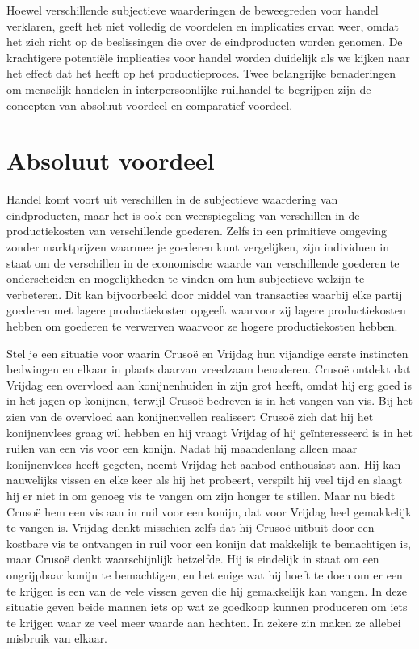Hoewel verschillende subjectieve waarderingen de beweegreden voor handel verklaren, geeft het niet volledig de voordelen en implicaties ervan weer, omdat het zich richt op de beslissingen die over de eindproducten worden genomen. De krachtigere potentiële implicaties voor handel worden duidelijk als we kijken naar het effect dat het heeft op het productieproces. Twee belangrijke benaderingen om menselijk handelen in interpersoonlijke ruilhandel te begrijpen zijn de concepten van absoluut voordeel en comparatief voordeel.

\hypertarget{absoluut-voordeel}{%
\section{Absoluut voordeel}\label{absoluut-voordeel}}

Handel komt voort uit verschillen in de subjectieve waardering van eindproducten, maar het is ook een weerspiegeling van verschillen in de productiekosten van verschillende goederen. Zelfs in een primitieve omgeving zonder marktprijzen waarmee je goederen kunt vergelijken, zijn individuen in staat om de verschillen in de economische waarde van verschillende goederen te onderscheiden en mogelijkheden te vinden om hun subjectieve welzijn te verbeteren. Dit kan bijvoorbeeld door middel van transacties waarbij elke partij goederen met lagere productiekosten opgeeft waarvoor zij lagere productiekosten hebben  om goederen te verwerven waarvoor ze hogere productiekosten hebben.

Stel je een situatie voor waarin Crusoë en Vrijdag hun vijandige eerste instincten bedwingen en elkaar in plaats daarvan vreedzaam benaderen. Crusoë ontdekt dat Vrijdag een overvloed aan konijnenhuiden in zijn grot heeft, omdat hij erg goed is in het jagen op konijnen, terwijl Crusoë bedreven is in het vangen van vis. Bij het zien van de overvloed aan konijnenvellen realiseert Crusoë zich dat hij het konijnenvlees graag wil hebben en hij vraagt Vrijdag of hij geïnteresseerd is in het ruilen van een vis voor een konijn. Nadat hij maandenlang alleen maar konijnenvlees heeft gegeten, neemt Vrijdag het aanbod enthousiast aan. Hij kan nauwelijks vissen en elke keer als hij het probeert, verspilt hij veel tijd en slaagt hij er niet in om genoeg vis te vangen om zijn honger te stillen. Maar nu biedt Crusoë hem een vis aan in ruil voor een konijn, dat voor Vrijdag heel gemakkelijk te vangen is. Vrijdag denkt misschien zelfs dat hij Crusoë uitbuit door een kostbare vis te ontvangen in ruil voor een konijn dat makkelijk te bemachtigen is, maar Crusoë denkt waarschijnlijk hetzelfde. Hij is eindelijk in staat om een ongrijpbaar konijn te bemachtigen, en het enige wat hij hoeft te doen om er een te krijgen is een van de vele vissen geven die hij gemakkelijk kan vangen. In deze situatie geven beide mannen iets op wat ze goedkoop kunnen produceren om iets te krijgen waar ze veel meer waarde aan hechten. In zekere zin maken ze allebei misbruik van elkaar.

